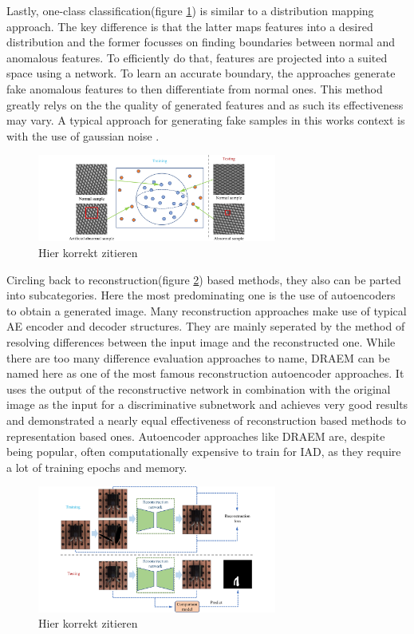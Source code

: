 Lastly, one-class classification(figure \ref{fig:OCCviz}) is 
similar to a distribution mapping approach. The key difference is that the latter maps features into a desired distribution and the former focusses on finding boundaries between normal 
and anomalous features. To efficiently do that, features are projected into a suited space using a network. To learn an accurate boundary, the approaches generate fake anomalous features to 
then differentiate from normal ones. This method greatly relys on the the quality of generated features and as such its effectiveness may vary. A typical approach for generating fake samples 
in this works context is with the use of gaussian noise \cite{liu2023simplenet}.

\begin{figure}[H]
    \centering
    \includegraphics[width=0.7\textwidth]{figures/approachvizgeneral/OCCviz.jpg}
    \caption{Hier korrekt zitieren}
    \label{fig:OCCviz}
\end{figure}


Circling back to reconstruction(figure \ref{fig:autoencoderviz}) based methods, they also can be parted into subcategories. Here the most predominating one is the use of autoencoders to obtain a generated image. Many 
reconstruction approaches make use of typical AE encoder and decoder structures. They are mainly seperated by the method of resolving differences between the input image and the reconstructed one. 
While there are too many difference evaluation approaches to name, DRAEM \cite{Zavrtanik_2021DRAEM} can be named here as one of the most famous reconstruction autoencoder approaches. It uses 
the output of the reconstructive network in combination with the original image as the input for a discriminative subnetwork and achieves very good results and demonstrated a nearly equal effectiveness 
of reconstruction based methods to representation based ones. Autoencoder approaches like DRAEM are, despite being popular, often computationally expensive to train for IAD, as they require a lot of 
training epochs and memory. %

\begin{figure}[H]
    \centering
    \includegraphics[width=0.7\textwidth]{figures/approachvizgeneral/autoencoderbiz.jpg}
    \caption{Hier korrekt zitieren}
    \label{fig:autoencoderviz}
\end{figure}


